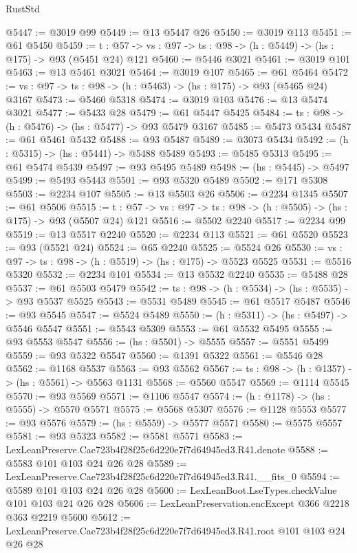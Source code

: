 \begin{lexlean}{RustStd}
\begin{coremodule}
@5447 := @3019 @99
@5449 := @13 @5447 @26
@5450 := @3019 @113
@5451 := @61 @5450
@5459 := {t : @57} -> {vs : @97} -> {ts : @98} -> (h : @5449) -> (hs : @175) -> @93 (@5451 @24) @121
@5460 := @5446 @3021
@5461 := @3019 @101
@5463 := @13 @5461 @3021
@5464 := @3019 @107
@5465 := @61 @5464
@5472 := {vs : @97} -> {ts : @98} -> (h : @5463) -> (hs : @175) -> @93 (@5465 @24) @3167
@5473 := @5460 @5318
@5474 := @3019 @103
@5476 := @13 @5474 @3021
@5477 := @5433 @28
@5479 := @61 @5447 @5425
@5484 := {ts : @98} -> (h : @5476) -> (hs : @5477) -> @93 @5479 @3167
@5485 := @5473 @5434
@5487 := @61 @5461 @5432
@5488 := @93 @5487
@5489 := @3073 @5434
@5492 := (h : @5315) -> (hs : @5441) -> @5488 @5489
@5493 := @5485 @5313
@5495 := @61 @5474 @5439
@5497 := @93 @5495 @5489
@5498 := (hs : @5445) -> @5497
@5499 := @5493 @5443
@5501 := @93 @5320 @5489
@5502 := @171 @5308
@5503 := @2234 @107
@5505 := @13 @5503 @26
@5506 := @2234 @1345
@5507 := @61 @5506
@5515 := {t : @57} -> {vs : @97} -> {ts : @98} -> (h : @5505) -> (hs : @175) -> @93 (@5507 @24) @121
@5516 := @5502 @2240
@5517 := @2234 @99
@5519 := @13 @5517 @2240
@5520 := @2234 @113
@5521 := @61 @5520
@5523 := @93 (@5521 @24)
@5524 := @65 @2240
@5525 := @5524 @26
@5530 := {vs : @97} -> {ts : @98} -> (h : @5519) -> (hs : @175) -> @5523 @5525
@5531 := @5516 @5320
@5532 := @2234 @101
@5534 := @13 @5532 @2240
@5535 := @5488 @28
@5537 := @61 @5503 @5479
@5542 := {ts : @98} -> (h : @5534) -> (hs : @5535) -> @93 @5537 @5525
@5543 := @5531 @5489
@5545 := @61 @5517 @5487
@5546 := @93 @5545
@5547 := @5524 @5489
@5550 := (h : @5311) -> (hs : @5497) -> @5546 @5547
@5551 := @5543 @5309
@5553 := @61 @5532 @5495
@5555 := @93 @5553 @5547
@5556 := (hs : @5501) -> @5555
@5557 := @5551 @5499
@5559 := @93 @5322 @5547
@5560 := @1391 @5322
@5561 := @5546 @28
@5562 := @1168 @5537
@5563 := @93 @5562
@5567 := {ts : @98} -> (h : @1357) -> (hs : @5561) -> @5563 @1131
@5568 := @5560 @5547
@5569 := @1114 @5545
@5570 := @93 @5569
@5571 := @1106 @5547
@5574 := (h : @1178) -> (hs : @5555) -> @5570 @5571
@5575 := @5568 @5307
@5576 := @1128 @5553
@5577 := @93 @5576
@5579 := (hs : @5559) -> @5577 @5571
@5580 := @5575 @5557
@5581 := @93 @5323
@5582 := @5581 @5571
@5583 := LexLeanPreserve.Cae723b4f28f25c6d220e7f7d64945ed3.R41.denote
@5588 := @5583 @101 @103 @24 @26 @28
@5589 := LexLeanPreserve.Cae723b4f28f25c6d220e7f7d64945ed3.R41.__fits_0
@5594 := @5589 @101 @103 @24 @26 @28
@5600 := LexLeanBoot.LseTypes.checkValue @101 @103 @24 @26 @28
@5606 := LexLeanPreservation.encExcept @366 @2218 @363 @2219 @5600
@5612 := LexLeanPreserve.Cae723b4f28f25c6d220e7f7d64945ed3.R41.root @101 @103 @24 @26 @28

\end{coremodule}
\end{lexlean}
